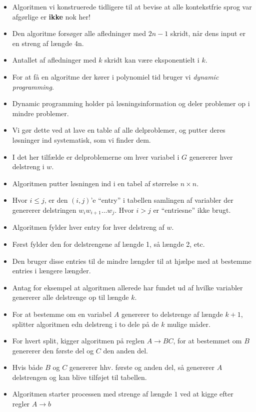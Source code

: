 \begin{frame}[allowframebreaks]
  \begin{itemize}
    \item Algoritmen vi konstruerede tidligere til at bevise at alle kontekstfrie sprog var afgørlige er \textbf{ikke} nok her!
    \item Den algoritme forsøger alle afledninger med $2n-1$ skridt, når dens input er en streng af længde 4n.
    \item Antallet af afledninger med $k$ skridt kan være eksponentielt i $k$.
    \item For at få en algoritme der kører i polynomiel tid bruger vi \textit{dynamic programming}.
    \item Dynamic programming holder på løsningsinformation og deler problemer op i mindre problemer.
    \item Vi gør dette ved at lave en table af alle delproblemer, og putter deres løsninger ind systematisk, som vi finder dem.
    \item I det her tilfælde er delproblemerne om hver variabel i $G$ genererer hver delstreng i $w$.
    \item Algoritmen putter løsningen ind i en tabel af størrelse $n \times n$.
    \item Hvor $i \le j$, er den $(i,j)$'e ``entry'' i tabellen samlingen af variabler der genererer delstringen $w_{i}w_{i+1}\ldots w_{j}$. Hvor $i > j$ er ``entriesne'' ikke brugt.
    \item Algoritmen fylder hver entry for hver delstreng af $w$.
    \item Først fylder den for delstrengene af længde 1, så længde 2, etc.
    \item Den bruger disse entries til de mindre længder til at hjælpe med at bestemme entries i længere længder.
    \item Antag for eksempel at algoritmen allerede har fundet ud af hvilke variabler genererer alle delstrenge op til længde $k$.
    \item For at bestemme om en variabel $A$ genererer to delstrenge af længde $k+1$, splitter algoritmen edn delstreng i to dele på de $k$ mulige måder.
    \item For hvert split, kigger algoritmen på reglen $A \rightarrow BC$, for at bestemmet om $B$ genererer den første del og $C$ den anden del.
    \item Hvis både $B$ og $C$ genererer hhv. første og anden del, så genererer $A$ delstrengen og kan blive tilføjet til tabellen.
    \item Algoritmen starter processen med strenge af længde $1$ ved at kigge efter regler $A \rightarrow b$

\end{itemize}
\end{frame}
